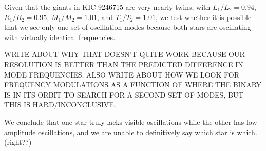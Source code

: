 Given that the giants in KIC 9246715 are very nearly twins, with $L_1/L_2 = 0.94$, $R_1/R_2 = 0.95$, $M_1/M_2 = 1.01$, and $T_1/T_2 = 1.01$, we test whether it is possible that we see only one set of oscillation modes because both stars are oscillating with virtually identical frequencies. 

WRITE ABOUT WHY THAT DOESN'T QUITE WORK BECAUSE OUR RESOLUTION IS BETTER THAN THE PREDICTED DIFFERENCE IN MODE FREQUENCIES. ALSO WRITE ABOUT HOW WE LOOK FOR FREQUENCY MODULATIONS AS A FUNCTION OF WHERE THE BINARY IS IN ITS ORBIT TO SEARCH FOR A SECOND SET OF MODES, BUT THIS IS HARD/INCONCLUSIVE.

We conclude that one star truly lacks visible oscillations while the other has low-amplitude oscillations, and we are unable to definitively say which star is which. (right??)